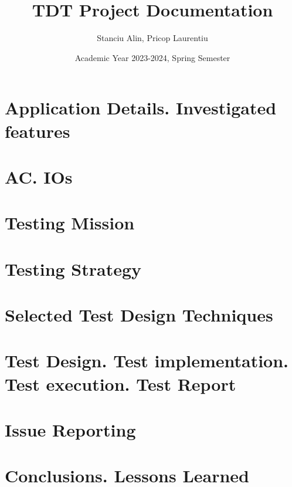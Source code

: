 \documentclass{article}
\title{TDT Project Documentation}
\author{Stanciu Alin, Pricop Laurentiu}
\date{Academic Year 2023-2024, Spring Semester}
\begin{document}
\maketitle
\tableofcontents

\section{Application Details. Investigated features}

\section{AC. IOs}

\section{Testing Mission}

\section{Testing Strategy}

\section{Selected Test Design Techniques}

\section{Test Design. Test implementation. Test execution. Test Report}

\section{Issue Reporting}

\section{Conclusions. Lessons Learned}
\end{document}
